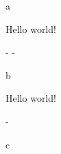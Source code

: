 \documentclass{article}
\begin{document}
  a
  \begin{texvoiceListing}
   Hello world!
   \begin{tasks}
    \description - \duration - \wage
   \end{tasks}
   \begin{expenses}
   \description \price
   \end{expenses}
  \end{texvoiceListing}
  b
  \begin{texvoiceListing}
   Hello world!
   \begin{travel}
    \from - \to
   \end{travel}
  \end{texvoiceListing}
  c
\end{document}
